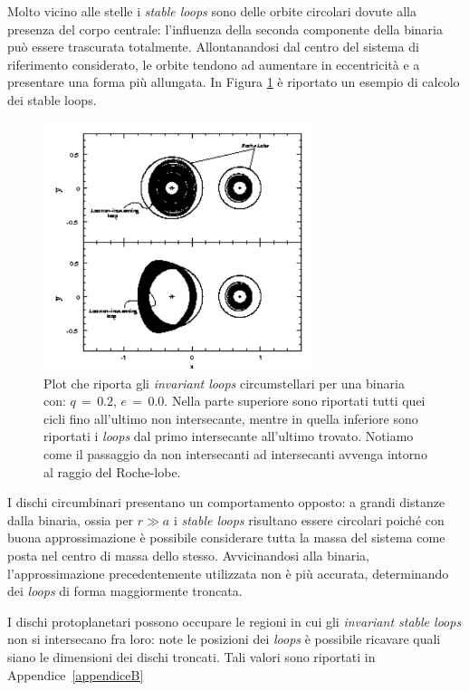 Molto vicino alle stelle i \textit{stable loops} sono delle orbite circolari dovute alla presenza del corpo centrale: l'influenza della seconda componente della binaria può essere trascurata totalmente. Allontanandosi dal centro del sistema di riferimento considerato, le orbite tendono ad aumentare in eccentricità e a presentare una forma più allungata. In Figura \ref{fig:stable_loops_Pichardo} è riportato un esempio di calcolo dei stable loops.

\begin{figure}[h]
  \centering
  \includegraphics[width=0.7\textwidth]{Immagini/IntroTeorica/StableLoopsPichardo.png}
  \caption{Plot che riporta gli \textit{invariant loops} circumstellari per una binaria con: $q\,=\,0.2$, $e\,=\,0.0$. Nella parte superiore sono riportati tutti quei cicli fino all'ultimo non intersecante, mentre in quella inferiore sono riportati i \textit{loops} dal primo intersecante all'ultimo trovato. Notiamo come il passaggio da non intersecanti ad intersecanti avvenga intorno al raggio del Roche-lobe. \parencite{Pichardo2005}}
  \label{fig:stable_loops_Pichardo}
\end{figure}

I dischi circumbinari presentano un comportamento opposto: a grandi distanze dalla binaria, ossia per $r \gg a$ i \textit{stable loops} risultano essere circolari poiché con buona approssimazione è possibile considerare tutta la massa del sistema come posta nel centro di massa dello stesso. Avvicinandosi alla binaria, l'approssimazione precedentemente utilizzata non è più accurata, determinando dei \textit{loops} di forma maggiormente troncata.

I dischi protoplanetari possono occupare le regioni in cui gli \textit{invariant stable loops} non si intersecano fra loro: note le posizioni dei \textit{loops} è possibile ricavare quali siano le dimensioni dei dischi troncati. Tali valori sono riportati in Appendice~\ref{appendiceB}

